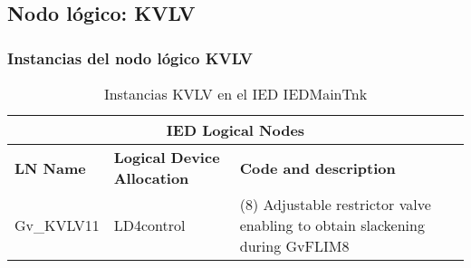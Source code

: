 
\subsection{Nodo l\'ogico: 			 KVLV}

    \subsubsection{Instancias del nodo l\'ogico KVLV}
    \begin{table}[H]
    \begin{center}
    \begin{tabular}{|l|l|p{6.8cm}|}
            \hline
            \multicolumn{3}{|c|}{\cellcolor[gray]{0.8} \textbf{IED Logical Nodes} } \\
            \hline
            \textbf{LN Name} & \textbf{Logical Device Allocation} & \textbf{Code and description} \\
            \hline
            Gv\_KVLV11 & LD4control & (8) Adjustable restrictor valve enabling to obtain slackening during GvFLIM8 \\
            \hline
    \end{tabular}
    \caption{Instancias KVLV en el IED IEDMainTnk}
    \label{table:lnInstKVLV_restrictor}
    \end{center}
    \end{table}
    
    
    
